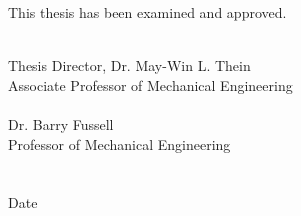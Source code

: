 \thispagestyle{empty}
\noindent This thesis has been examined and approved.
\vspace*{2.5cm}

\begin{minipage}{0.2\textwidth}
        \begin{flushleft}
        \end{flushleft}
    \end{minipage}
\begin{minipage}{0.8\textwidth}
        \begin{flushleft}
            \underline{\hspace{10cm}} \\
            Thesis Director, Dr. May-Win L. Thein\\
            Associate Professor of Mechanical Engineering\\
            \vspace{1.5cm}
            \underline{\hspace{10cm}} \\
            Dr. Barry Fussell\\
            Professor of Mechanical Engineering\\
            \vspace{1.5cm}
            \underline{\hspace{10cm}} \\
            \vspace{2cm}
            \hspace{3cm}\underline{\hspace{7cm}} \\
            \hspace{3cm}Date
        \end{flushleft}
\end{minipage}\\[1cm]

\pagebreak